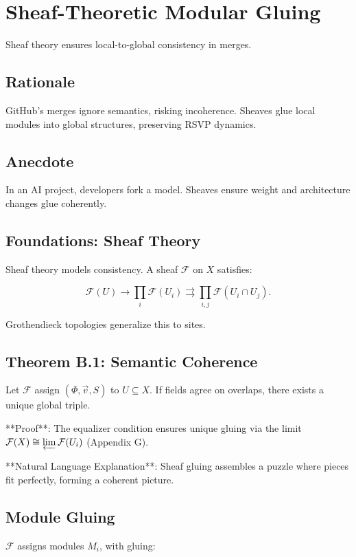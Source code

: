 \section{Sheaf-Theoretic Modular Gluing}
\label{sec:chapter4}

Sheaf theory ensures local-to-global consistency in merges.

\subsection{Rationale}
GitHub’s merges ignore semantics, risking incoherence. Sheaves glue local modules into global structures, preserving RSVP dynamics.

\subsection{Anecdote}
In an AI project, developers fork a model. Sheaves ensure weight and architecture changes glue coherently.

\subsection{Foundations: Sheaf Theory}
Sheaf theory \cite{mac2013categories} models consistency. A sheaf $\mathcal{F}$ on $X$ satisfies:

\[
\mathcal{F}(U) \to \prod_i \mathcal{F}(U_i) \rightrightarrows \prod_{i,j} \mathcal{F}(U_i \cap U_j).
\]

Grothendieck topologies generalize this to sites.

\subsection{Theorem B.1: Semantic Coherence}
Let $\mathcal{F}$ assign $(\Phi, \vec{v}, S)$ to $U \subseteq X$. If fields agree on overlaps, there exists a unique global triple.

**Proof**: The equalizer condition ensures unique gluing via the limit $\mathcal{F}(X) \cong \varprojlim \mathcal{F}(U_i)$ \cite{mac2013categories} (Appendix G).

**Natural Language Explanation**: Sheaf gluing assembles a puzzle where pieces fit perfectly, forming a coherent picture.

\subsection{Module Gluing}
$\mathcal{F}$ assigns modules $M_i$, with gluing:

